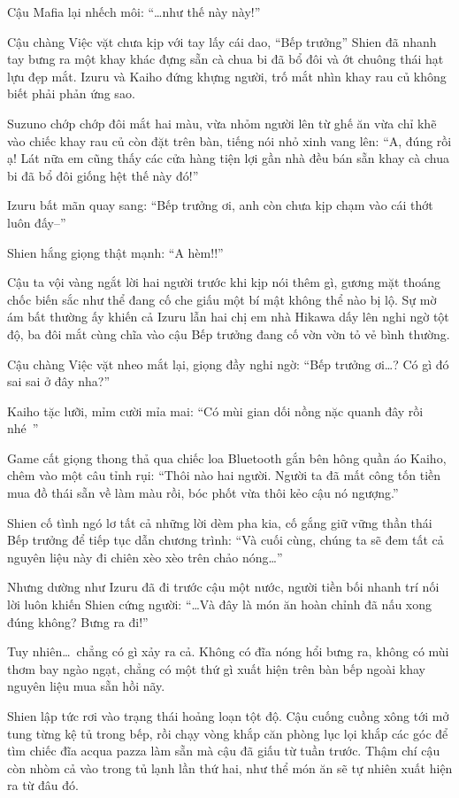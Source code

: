 \documentclass[../main.tex]{subfiles}
\begin{document}
Cậu Mafia lại nhếch môi: ``\dots như thế này này!''

Cậu chàng Việc vặt chưa kịp với tay lấy cái dao, ``Bếp trưởng'' Shien đã nhanh tay bưng ra một khay khác đựng sẵn cà chua bi đã bổ đôi và ớt chuông thái hạt lựu đẹp mắt. Izuru và Kaiho đứng khựng người, trố mắt nhìn khay rau củ không biết phải phản ứng sao.


Suzuno chớp chớp đôi mắt hai màu, vừa nhỏm người lên từ ghế ăn vừa chỉ khẽ vào chiếc khay rau củ còn đặt trên bàn, tiếng nói nhỏ xinh vang lên: ``A, đúng rồi ạ! Lát nữa em cũng thấy các cửa hàng tiện lợi gần nhà đều bán sẵn khay cà chua bi đã bổ đôi giống hệt thế này đó!''

Izuru bất mãn quay sang: ``Bếp trưởng ơi, anh còn chưa kịp chạm vào cái thớt luôn đấy--''

Shien hắng giọng thật mạnh: ``A hèm!!''

Cậu ta vội vàng ngắt lời hai người trước khi kịp nói thêm gì, gương mặt thoáng chốc biến sắc như thể đang cố che giấu một bí mật không thể nào bị lộ. Sự mờ ám bất thường ấy khiến cả Izuru lẫn hai chị em nhà Hikawa dấy lên nghi ngờ tột độ, ba đôi mắt cùng chĩa vào cậu Bếp trưởng đang cố vờn vờn tỏ vẻ bình thường.

Cậu chàng Việc vặt nheo mắt lại, giọng đầy nghi ngờ: ``Bếp trưởng ơi\dots? Có gì đó sai sai ở đây nha?''

Kaiho tặc lưỡi, mỉm cười mỉa mai: ``Có mùi gian dối nồng nặc quanh đây rồi nhé~''

Game cất giọng thong thả qua chiếc loa Bluetooth gắn bên hông quần áo Kaiho, chêm vào một câu tỉnh rụi: ``Thôi nào hai người. Người ta đã mất công tốn tiền mua đồ thái sẵn về làm màu rồi, bóc phốt vừa thôi kẻo cậu nó ngượng.''

Shien cố tình ngó lơ tất cả những lời dèm pha kia, cố gắng giữ vững thần thái Bếp trưởng để tiếp tục dẫn chương trình: ``Và cuối cùng, chúng ta sẽ đem tất cả nguyên liệu này đi chiên xèo xèo trên chảo nóng\dots''

Nhưng dường như Izuru đã đi trước cậu một nước, người tiền bối nhanh trí nối lời luôn khiến Shien cứng người: ``\dots Và đây là món ăn hoàn chỉnh đã nấu xong đúng không? Bưng ra đi!''

Tuy nhiên\dots\ chẳng có gì xảy ra cả. Không có đĩa nóng hổi bưng ra, không có mùi thơm bay ngào ngạt, chẳng có một thứ gì xuất hiện trên bàn bếp ngoài khay nguyên liệu mua sẵn hồi nãy.

Shien lập tức rơi vào trạng thái hoảng loạn tột độ. Cậu cuống cuồng xông tới mở tung từng kệ tủ trong bếp, rồi chạy vòng khắp căn phòng lục lọi khắp các góc để tìm chiếc đĩa acqua pazza làm sẵn mà cậu đã giấu từ tuần trước. Thậm chí cậu còn nhòm cả vào trong tủ lạnh lần thứ hai, như thể món ăn sẽ tự nhiên xuất hiện ra từ đâu đó.
\end{document}
